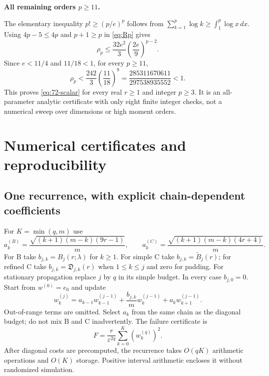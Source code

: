 \documentclass[11pt]{article}
\numberwithin{equation}{section}
\theoremstyle{definition}\newtheorem{definition}[theorem]{Definition}
\theoremstyle{remark}\newtheorem{remark}[theorem]{Remark}
\newcommand{\step}[1]{\par\addvspace{.65\baselineskip}\Needspace{4\baselineskip}\noindent\textbf{#1}\par\nobreak\smallskip}
\begin{document}
\step{All remaining orders $p\ge11$.}
The elementary inequality $p!\ge(p/e)^p$ follows from
$\sum_{k=1}^p\log k\ge\int_1^p\log x\,dx$.
Using $4p-5\le4p$ and $p+1\ge p$ in \eqref{eq:Rp} gives
\[
 \rho_p\le\frac{32e^2}{3}\left(\frac{2e}{9}\right)^{p-2}.
\]
Since $e<11/4$ and $11/18<1$, for every $p\ge11$,
\[
 \rho_p<\frac{242}{3}\left(\frac{11}{18}\right)^9
 =\frac{285311670611}{297538935552}<1.
\]
This proves \eqref{eq:72-scalar} for every real $r\ge1$ and integer $p\ge3$.
It is an all-parameter analytic certificate with only eight finite integer checks,
not a numerical sweep over dimensions or high moment orders.

\section{Numerical certificates and reproducibility}\label{app:checks}
\subsection{One recurrence, with explicit chain-dependent coefficients}
For $K=\min(q,m)$ use
\[
 a_k^{(B)}=\frac{\sqrt{(k+1)(m-k)(9r-1)}}m,
 \qquad
 a_k^{(C)}=\frac{\sqrt{(k+1)(m-k)(4r+4)}}m.
\]
For B take $b_{j,k}=B_j(r;\lambda)$ for $k\ge1$. For simple C take
$b_{j,k}=\widetilde B_j(r)$; for refined C take
$b_{j,k}=\mathfrak D_{j,k}(r)$ when $1\le k\le j$ and zero for padding.
For stationary propagation replace $j$ by $q$ in its simple budget.
In every case $b_{j,0}=0$. Start from $w^{(0)}=e_0$ and update
\begin{equation}\label{eq:recurrence}
 w_k^{(j)}=a_{k-1}w_{k-1}^{(j-1)}+
 \frac{b_{j,k}}m w_k^{(j-1)}+a_kw_{k+1}^{(j-1)}.
\end{equation}
Out-of-range terms are omitted. Select $a_k$ from the same chain as the diagonal
budget; do not mix B and C inadvertently. The failure certificate is
\begin{equation}\label{eq:numeric-failure}
 F=\frac r{\varepsilon^{2q}}\sum_{k=0}^K(w_k^{(q)})^2.
\end{equation}
After diagonal costs are precomputed, the recurrence takes $O(qK)$ arithmetic
operations and $O(K)$ storage. Positive interval arithmetic encloses it
without randomized simulation.
\end{document}
